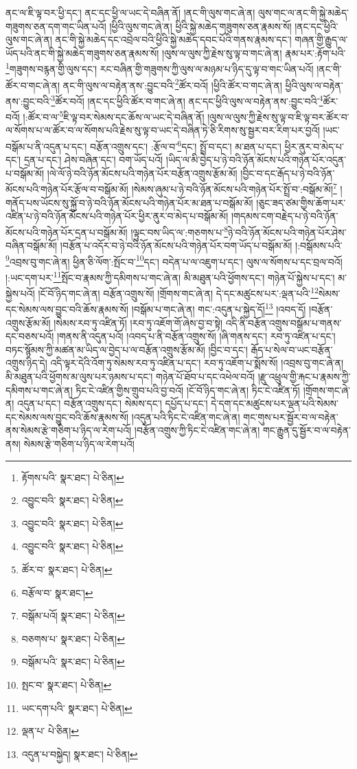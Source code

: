 ནང་ལ་ཇི་ལྟ་བར་ཕྱི་དང་། ནང་དང་ཕྱི་ལ་ཡང་དེ་བཞིན་ནོ། །ནང་གི་ལུས་གང་ཞེ་ན། ལུས་གང་ལ་ནང་གི་སྐྱེ་མཆེད་གཟུགས་ཅན་དག་གང་ཡིན་པའོ། །ཕྱིའི་ལུས་གང་ཞེ་ན། ཕྱིའི་སྐྱེ་མཆེད་གཟུགས་ཅན་རྣམས་སོ། །ནང་དང་ཕྱིའི་ལུས་གང་ཞེ་ན། ནང་གི་སྐྱེ་མཆེད་དང་འབྲེལ་བའི་ཕྱིའི་སྐྱེ་མཆེད་དབང་པོའི་གནས་རྣམས་དང་། གཞན་གྱི་རྒྱུད་ལ་ཡོད་པའི་ནང་གི་སྐྱེ་མཆེད་གཟུགས་ཅན་རྣམས་སོ། །ལུས་ལ་ལུས་ཀྱི་རྗེས་སུ་ལྟ་བ་གང་ཞེ་ན། རྣམ་པར་:རྟོག་པའི་\footnote{རྟོགས་པའི་  སྣར་ཐང་།  པེ་ཅིན། }གཟུགས་བརྙན་གྱི་ལུས་དང་། རང་བཞིན་གྱི་གཟུགས་ཀྱི་ལུས་ལ་མཉམ་པ་ཉིད་དུ་ལྟ་བ་གང་ཡིན་པའོ། །ནང་གི་ཚོར་བ་གང་ཞེ་ན། ནང་གི་ལུས་ལ་བརྟེན་ནས་:བྱུང་བའི་\footnote{འབྱུང་བའི་  སྣར་ཐང་།  པེ་ཅིན། }ཚོར་བའོ། །ཕྱིའི་ཚོར་བ་གང་ཞེ་ན། ཕྱིའི་ལུས་ལ་བརྟེན་ནས་:བྱུང་བའི་\footnote{འབྱུང་བའི་  སྣར་ཐང་།  པེ་ཅིན། }ཚོར་བའོ། །ནང་དང་ཕྱིའི་ཚོར་བ་གང་ཞེ་ན། ནང་དང་ཕྱིའི་ལུས་ལ་བརྟེན་ནས་:བྱུང་བའི་\footnote{འབྱུང་བའི་  སྣར་ཐང་།  པེ་ཅིན། }ཚོར་བའོ། །:ཚོར་བ་ལ་\footnote{ཚོར་བ་  སྣར་ཐང་།  པེ་ཅིན། }ཇི་ལྟ་བར་སེམས་དང་ཆོས་ལ་ཡང་དེ་བཞིན་ནོ། །ལུས་ལ་ལུས་ཀྱི་རྗེས་སུ་ལྟ་བ་ཇི་ལྟ་བར་ཚོར་བ་ལ་སོགས་པ་ལ་ཚོར་བ་ལ་སོགས་པའི་རྗེས་སུ་ལྟ་བ་ཡང་དེ་བཞིན་ཏེ་ཅི་རིགས་སུ་སྦྱར་བར་རིག་པར་བྱའོ། །ཡང་བསྒོམ་པ་ནི་འདུན་པ་དང་། བརྩོན་འགྲུས་དང་། :རྩོལ་བ་\footnote{བརྩོལ་བ་  སྣར་ཐང་། }དང་། སྤྲོ་བ་དང་། མ་ཐན་པ་དང་། ཕྱིར་ནུར་བ་མེད་པ་དང་། དྲན་པ་དང་། ཤེས་བཞིན་དང་། བག་ཡོད་པའོ། །ཡིད་ལ་མི་བྱེད་པ་ཉེ་བའི་ཉོན་མོངས་པའི་གཉེན་པོར་འདུན་པ་བསྒོམ་མོ། །ལེ་ལོ་ཉེ་བའི་ཉོན་མོངས་པའི་གཉེན་པོར་བརྩོན་འགྲུས་རྩོམ་མོ། །བྱིང་བ་དང་རྒོད་པ་ཉེ་བའི་ཉོན་མོངས་པའི་གཉེན་པོར་རྩོལ་བ་བསྒོམ་མོ། །སེམས་ཞུམ་པ་ཉེ་བའི་ཉོན་མོངས་པའི་གཉེན་པོར་སྤྲོ་བ་:བསྒོམ་མོ།\footnote{བསྒོམ་པའོ།  སྣར་ཐང་།  པེ་ཅིན། } །གནོད་པས་ཡོངས་སུ་སྐྱོ་བ་ཉེ་བའི་ཉོན་མོངས་པའི་གཉེན་པོར་མ་ཐན་པ་བསྒོམ་མོ། །ཅུང་ཟད་ཙམ་གྱིས་ཆོག་པར་འཛིན་པ་ཉེ་བའི་ཉོན་མོངས་པའི་གཉེན་པོར་ཕྱིར་ནུར་བ་མེད་པ་བསྒོམ་མོ། །གདམས་ངག་བརྗེད་པ་ཉེ་བའི་ཉོན་མོངས་པའི་གཉེན་པོར་དྲན་པ་བསྒོམ་མོ། །ལྟུང་བས་ཡིད་ལ་:གཅགས་པ་\footnote{བཅགས་པ་  སྣར་ཐང་།  པེ་ཅིན། }ཉེ་བའི་ཉོན་མོངས་པའི་གཉེན་པོར་ཤེས་བཞིན་བསྒོམ་མོ། །བརྩོན་པ་འདོར་བ་ཉེ་བའི་ཉོན་མོངས་པའི་གཉེན་པོར་བག་ཡོད་པ་བསྒོམ་མོ། །:བསྒོམས་པའི་\footnote{བསྒོམ་པའི་  སྣར་ཐང་།  པེ་ཅིན། }འབྲས་བུ་གང་ཞེ་ན། ཕྱིན་ཅི་ལོག་:སྤོང་བ་\footnote{སྤང་བ་  སྣར་ཐང་།  པེ་ཅིན། }དང་། བདེན་པ་ལ་འཇུག་པ་དང་། ལུས་ལ་སོགས་པ་དང་བྲལ་བའོ། །:ཡང་དག་པར་\footnote{ཡང་དག་པའི་  སྣར་ཐང་།  པེ་ཅིན། }སྤོང་བ་རྣམས་ཀྱི་དམིགས་པ་གང་ཞེ་ན། མི་མཐུན་པའི་ཕྱོགས་དང་། གཉེན་པོ་སྐྱེས་པ་དང་། མ་སྐྱེས་པའོ། །ངོ་བོ་ཉིད་གང་ཞེ་ན། བརྩོན་འགྲུས་སོ། །གྲོགས་གང་ཞེ་ན། དེ་དང་མཚུངས་པར་:ལྡན་པའི་\footnote{ལྡན་པ་  པེ་ཅིན། }སེམས་དང་སེམས་ལས་བྱུང་བའི་ཆོས་རྣམས་སོ། །བསྒོམ་པ་གང་ཞེ་ན། གང་:འདུན་པ་སྐྱེད་དོ།\footnote{འདུན་པ་བསྐྱེད།  སྣར་ཐང་།  པེ་ཅིན། } །འབད་དོ། །བརྩོན་འགྲུས་རྩོམ་མོ། །སེམས་རབ་ཏུ་འཛིན་ཏོ། །རབ་ཏུ་འཇོག་གོ་ཞེས་བྱ་བ་སྟེ། འདི་ནི་བརྩོན་འགྲུས་བསྒོམ་པ་གནས་དང་བཅས་པའོ། །གནས་ནི་འདུན་པའོ། །འབད་པ་ནི་བརྩོན་འགྲུས་སོ། །ཞི་གནས་དང་། རབ་ཏུ་འཛིན་པ་དང་། བཏང་སྙོམས་ཀྱི་མཚན་མ་ཡིད་ལ་བྱེད་པ་ལ་བརྩོན་འགྲུས་རྩོམ་མོ། །བྱིང་བ་དང་། རྒོད་པ་སེལ་བ་ཡང་བརྩོན་འགྲུས་ཉིད་དེ། འདི་ལྟར་དེའི་འོག་ཏུ་སེམས་རབ་ཏུ་འཛིན་པ་དང་། རབ་ཏུ་འཇོག་པ་སྨོས་སོ། །འབྲས་བུ་གང་ཞེ་ན། མི་མཐུན་པའི་ཕྱོགས་མ་ལུས་པར་ཉམས་པ་དང་། གཉེན་པོ་ཐོབ་པ་དང་འཕེལ་བའོ། །རྫུ་འཕྲུལ་གྱི་རྐང་པ་རྣམས་ཀྱི་དམིགས་པ་གང་ཞེ་ན། ཏིང་ངེ་འཛིན་གྱིས་གྲུབ་པའི་བྱ་བའོ། །ངོ་བོ་ཉིད་གང་ཞེ་ན། ཏིང་ངེ་འཛིན་ཏོ། །གྲོགས་གང་ཞེ་ན། འདུན་པ་དང་། བརྩོན་འགྲུས་དང་། སེམས་དང་། དཔྱོད་པ་དང་། དེ་དག་དང་མཚུངས་པར་ལྡན་པའི་སེམས་དང་སེམས་ལས་བྱུང་བའི་ཆོས་རྣམས་སོ། །འདུན་པའི་ཏིང་ངེ་འཛིན་གང་ཞེ་ན། གང་གུས་པར་སྦྱོར་བ་ལ་བརྟེན་ནས་སེམས་རྩེ་གཅིག་པ་ཉིད་ལ་རེག་པའོ། །བརྩོན་འགྲུས་ཀྱི་ཏིང་ངེ་འཛིན་གང་ཞེ་ན། གང་རྒྱུན་དུ་སྦྱོར་བ་ལ་བརྟེན་ནས། སེམས་རྩེ་གཅིག་པ་ཉིད་ལ་རེག་པའོ། 